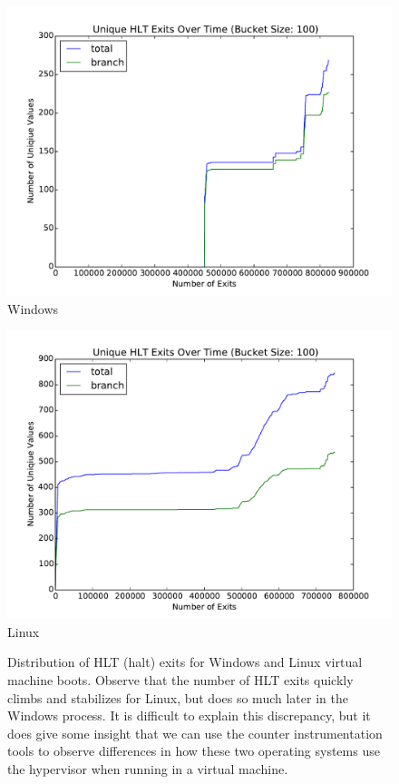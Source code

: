 \documentclass[notitlepage]{article}
\begin{document}
\begin{figure}[htpb!]
    \centering
    \begin{minipage}{.5\textwidth}
        \centering
        \includegraphics[width=1\textwidth]{hlt_windows.pdf}
        Windows
    \end{minipage}%
    \begin{minipage}{0.5\textwidth}
        \centering
        \includegraphics[width=1\textwidth]{hlt_linux.pdf}
        Linux
    \end{minipage}
    \caption{Distribution of HLT (halt) exits for Windows and Linux virtual machine
    boots. Observe that the number of HLT exits quickly climbs and stabilizes for
    Linux, but does so much later in the Windows process. It is difficult to explain
    this discrepancy, but it does give some insight that we can use the counter
    instrumentation tools to observe differences in how these two operating systems
    use the hypervisor when running in a virtual machine.}
    \label{fig:winlinhlt}
\end{figure}
\end{document}
